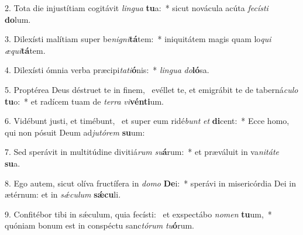 2. Tota die injustítiam cogitávit \textit{lin}\textit{gua} \textbf{tu}a:~*  sicut novácula acúta \textit{fe}\textit{cís}\textit{ti} \textbf{do}lum.\

3. Dilexísti malítiam super be\textit{ni}\textit{gni}\textbf{tá}tem:~*  iniquitátem magis quam lo\textit{qui} \textit{æ}\textit{qui}\textbf{tá}tem.\

4. Dilexísti ómnia verba præcipi\textit{ta}\textit{ti}\textbf{ó}nis:~*  \textit{lin}\textit{gua} \textit{do}\textbf{ló}sa.\

5. Proptérea Deus déstruet te in finem, \dag\  evéllet te, et emigrábit te de taberná\textit{cu}\textit{lo} \textbf{tu}o:~*  et radícem tuam de \textit{ter}\textit{ra} \textit{vi}\textbf{vén}\textbf{ti}um.\

6. Vidébunt justi, et timébunt, \dag\  et super eum ridé\textit{bunt} \textit{et} \textbf{di}cent:~*  Ecce homo, qui non pósuit Deum ad\textit{ju}\textit{tó}\textit{rem} \textbf{su}um:\

7. Sed sperávit in multitúdine divitiá\textit{rum} \textit{su}\textbf{á}rum:~*  et præváluit in va\textit{ni}\textit{tá}\textit{te} \textbf{su}a.\

8. Ego autem, sicut olíva fructífera in \textit{do}\textit{mo} \textbf{De}i:~*  sperávi in misericórdia Dei in ætérnum: et in \textit{sǽ}\textit{cu}\textit{lum} \textbf{sǽ}\textbf{cu}li.\

9. Confitébor tibi in sǽculum, quia fecísti: \dag\  et exspectábo \textit{no}\textit{men} \textbf{tu}um,~*  quóniam bonum est in conspéctu sanc\textit{tó}\textit{rum} \textit{tu}\textbf{ó}rum.\

